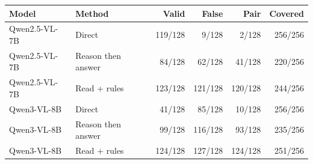 \begin{tabular}{llrrrr}
\toprule
Model & Method & Valid & False & Pair & Covered \\
\midrule
Qwen2.5-VL-7B & Direct & 119/128 & 9/128 & 2/128 & 256/256 \\
Qwen2.5-VL-7B & Reason then answer & 84/128 & 62/128 & 41/128 & 220/256 \\
Qwen2.5-VL-7B & Read + rules & 123/128 & 121/128 & 120/128 & 244/256 \\
Qwen3-VL-8B & Direct & 41/128 & 85/128 & 10/128 & 256/256 \\
Qwen3-VL-8B & Reason then answer & 99/128 & 116/128 & 93/128 & 235/256 \\
Qwen3-VL-8B & Read + rules & 124/128 & 127/128 & 124/128 & 251/256 \\
\bottomrule
\end{tabular}
